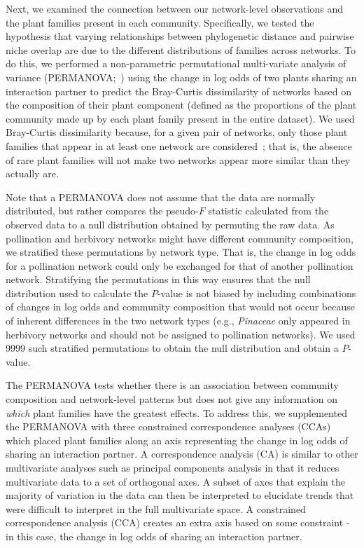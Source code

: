 \documentclass[12pt]{article}
\begin{document}
\begin{spacing}{1.5}
  Next, we examined the connection between our network-level observations
  and the plant families present in each community.
  Specifically, we tested the hypothesis that
  varying relationships between phylogenetic distance and
  pairwise niche overlap are due to the different distributions 
  of families across networks. To do this, we performed a non-parametric
  permutational multi-variate analysis of variance
  (PERMANOVA;~\citealp{Anderson2001}) using the change in log
  odds of two plants sharing an interaction partner to 
  predict the Bray-Curtis dissimilarity of networks
  based on the composition of their plant component
  (defined as the proportions of the plant community
  made up by each plant family present in the entire dataset).
  We used Bray-Curtis dissimilarity because, for a given
  pair of networks, only those plant families that appear
  in at least one network are considered~\citep{Anderson2001,Cirtwill2015}; 
  that is, the absence of rare plant families will not make 
  two networks appear more similar than they actually are. 


  Note that a PERMANOVA does not assume that the data are 
  normally distributed, but rather compares the pseudo-$F$ 
  statistic calculated from the observed data to a null 
  distribution obtained by permuting the raw data. As 
  pollination and herbivory networks might have different
  community composition, we stratified these permutations
  by network type. That is, the change in log odds for a pollination
  network could only be exchanged for that of another pollination
  network. Stratifying the permutations in this way ensures that 
  the null distribution used to calculate the $P$-value is not 
  biased by including combinations of changes in log odds and 
  community composition that would not occur because of inherent 
  differences in the two network types (e.g., \emph{Pinaceae} 
  only appeared in herbivory networks and should not be assigned 
  to pollination networks). We used 9999 such stratified permutations 
  to obtain the null distribution and obtain a $P$-value.


  The PERMANOVA tests whether there is an association between
  community composition and network-level patterns but does not
  give any information on \emph{which} plant families have the
  greatest effects. To address this, we supplemented the 
  PERMANOVA with three constrained correspondence analyses (CCAs)
  which placed plant families along an axis representing the
  change in log odds of sharing an interaction partner.
  A correspondence 
  analysis (CA) is similar to other multivariate
  analyses such as principal components analysis in that it
  reduces multivariate data to a set of orthogonal axes. A
  subset of axes that explain the majority of variation in 
  the data can then be interpreted to elucidate trends that
  were difficult to interpret in the full multivariate space.
  A constrained correspondence analysis (CCA) creates an extra
  axis based on some constraint - in this case, the change in
  log odds of sharing an interaction partner. 



\end{spacing}
\end{document}

